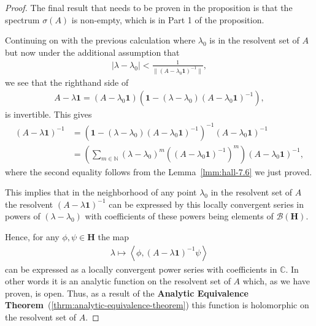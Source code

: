 \begin{proof}
The final result that needs to be proven in the proposition is that the spectrum $\sigma(A)$ is non-empty, which is in Part 1 of the proposition.

Continuing on with the previous calculation where $\lambda_0$ is in the resolvent set of $A$ but now under the additional assumption that
\begin{align}
    \lvert \lambda - \lambda_0 \rvert < \frac{1}{\|(A - \lambda_0 \mathbf{1})^{-1}\|},
\end{align}
we see that the righthand side of
\begin{align}
    A - \lambda \mathbf{1} = (A - \lambda_0 \mathbf{1})(\mathbf{1} - (\lambda - \lambda_0) (A - \lambda_0 \mathbf{1})^{-1} ),
\end{align}
is invertible. This gives
\begin{align}
    (A - \lambda \mathbf{1})^{-1} &= (\mathbf{1} - (\lambda - \lambda_0) (A - \lambda_0 \mathbf{1})^{-1} )^{-1} (A - \lambda_0 \mathbf{1})^{-1} \\
                                  &= \left( \sum_{m \in \mathbb{N}} (\lambda - \lambda_0)^m ((A - \lambda_0 \mathbf{1})^{-1})^m \right) (A - \lambda_0 \mathbf{1})^{-1},
\end{align}
where the second equality follows from the Lemma~\ref{lmm:hall-7.6} we just proved.

This implies that in the neighborhood of any point $\lambda_0$ in the resolvent set of $A$ the resolvent $(A - \lambda \mathbf{1})^{-1}$ can be expressed by this locally convergent series in powers of $(\lambda - \lambda_0)$ with coefficients of these powers being elements of $\mathcal{B}(\mathbf{H})$.

Hence, for any $\phi, \psi \in \mathbf{H}$ the map
\begin{align}
    \lambda \longmapsto \left< \phi, (A - \lambda \mathbf{1})^{-1} \psi \right>
\end{align}
can be expressed as a locally convergent power series with coefficients in $\mathbb{C}$. In other words it is an analytic function on the resolvent set of $A$ which, as we have proven, is open. Thus, as a result of the \textbf{Analytic Equivalence Theorem}~(\ref{thrm:analytic-equivalence-theorem}) this function is holomorphic on the resolvent set of $A$.


\end{proof}

